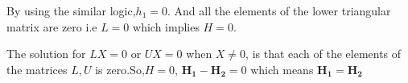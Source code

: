 \documentclass[journal,12pt,twocolumn]{IEEEtran}
\numberwithin{equation}{subsection}
\let\vec\mathbf
\begin{document}
By using the similar logic,$h_1=0$. And all the elements of the lower triangular matrix are zero i.e $L=0$ which implies $H=0$.\par
The solution for $LX=0$ or $UX=0$ when $X\neq 0$, is that each of the elements of the matrices $L,U$ is zero.So,$H=0$, $\vec{H_1}-\vec{H_2}=0$ which means $\vec{H_1}=\vec{H_2}$
\end{document}
